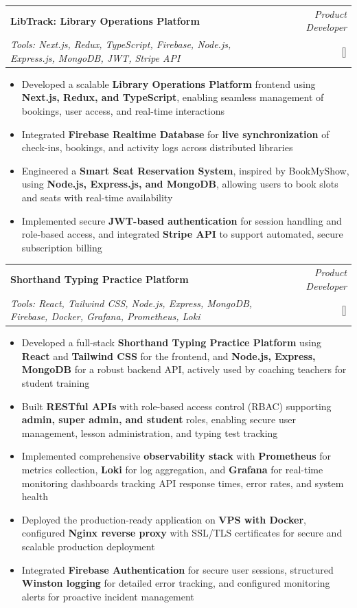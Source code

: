 \documentclass[a4paper,11pt]{article}
\makeatletter
\newcommand{\resumeProject}[4]{
\vspace{0.5mm}\item
    \begin{tabular*}{0.98\textwidth}[t]{l@{\extracolsep{\fill}}r}
        \textbf{#1} & \textit{\footnotesize{#3}} \\
        \footnotesize{\textit{#2}} & \footnotesize{#4}
    \end{tabular*}
    \vspace{-2.4mm}
}
\newcommand{\resumeItemListStart}{\begin{itemize}[leftmargin=*,labelsep=1mm,itemsep=0.5mm]}
\newcommand{\resumeItemListEnd}{\end{itemize}\vspace{-2mm}}
\makeatother
\begin{document}
\resumeProject
    {LibTrack: Library Operations Platform}
    {Tools: Next.js, Redux, TypeScript, Firebase, Node.js, Express.js, MongoDB, JWT, Stripe API}
    {Product Developer}
    {{}[\href{https://libraryLogix.com}{\textcolor{darkblue}{\faGlobe}}]}
\resumeItemListStart
    \item Developed a scalable \textbf{Library Operations Platform} frontend using \textbf{Next.js, Redux, and TypeScript}, enabling seamless management of bookings, user access, and real-time interactions
    \item Integrated \textbf{Firebase Realtime Database} for \textbf{live synchronization} of check-ins, bookings, and activity logs across distributed libraries
    \item Engineered a \textbf{Smart Seat Reservation System}, inspired by BookMyShow, using \textbf{Node.js, Express.js, and MongoDB}, allowing users to book slots and seats with real-time availability
    \item Implemented secure \textbf{JWT-based authentication} for session handling and role-based access, and integrated \textbf{Stripe API} to support automated, secure subscription billing
\resumeItemListEnd

\resumeProject
    {Shorthand Typing Practice Platform}
    {Tools: React, Tailwind CSS, Node.js, Express, MongoDB, Firebase, Docker, Grafana, Prometheus, Loki}
    {Product Developer}
    {{}[\href{https://www.vikalpshorthand.com/}{\textcolor{darkblue}{\faGlobe}}]}
\resumeItemListStart
    \item Developed a full-stack \textbf{Shorthand Typing Practice Platform} using \textbf{React} and \textbf{Tailwind CSS} for the frontend, and \textbf{Node.js, Express, MongoDB} for a robust backend API, actively used by coaching teachers for student training
    \item Built \textbf{RESTful APIs} with role-based access control (RBAC) supporting \textbf{admin, super admin, and student} roles, enabling secure user management, lesson administration, and typing test tracking
    \item Implemented comprehensive \textbf{observability stack} with \textbf{Prometheus} for metrics collection, \textbf{Loki} for log aggregation, and \textbf{Grafana} for real-time monitoring dashboards tracking API response times, error rates, and system health
    \item Deployed the production-ready application on \textbf{VPS with Docker}, configured \textbf{Nginx reverse proxy} with SSL/TLS certificates for secure and scalable production deployment
    \item Integrated \textbf{Firebase Authentication} for secure user sessions, structured \textbf{Winston logging} for detailed error tracking, and configured monitoring alerts for proactive incident management
\resumeItemListEnd
\end{document}
